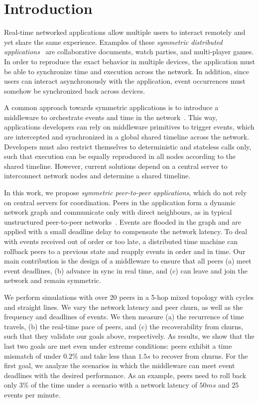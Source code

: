 \documentclass[12pt]{article}
\begin{document}
\section{Introduction}
\label{sec.introduction}

Real-time networked applications allow multiple users to interact remotely and
yet share the same experience.
Examples of these \emph{symmetric distributed applications}~\cite{gals} are
collaborative documents, watch parties, and multi-player games.
%
In order to reproduce the exact behavior in multiple devices, the application
must be able to synchronize time and execution across the network.
In addition, since users can interact asynchronously with the application,
event occurrences must somehow be synchronized back across devices.

A common approach towards symmetric applications is to introduce a middleware
to orchestrate events and time in the network~\cite{gals,croquet}.
This way, applications developers can rely on middleware primitives to trigger
events, which are intercepted and synchronized in a global shared timeline
across the network.
Developers must also restrict themselves to deterministic and stateless calls
only, such that execution can be equally reproduced in all nodes according to
the shared timeline. %
However, current solutions depend on a central server to interconnect network
nodes and determine a shared timeline.

In this work, we propose \emph{symmetric peer-to-peer applications}, which
do not rely on central servers for coordination.
Peers in the application form a dynamic network graph and communicate only
with direct neighbours, as in typical unstructured peer-to-peer
networks~\cite{p2p.survey}.
Events are flooded in the graph and are applied with a small deadline delay to
compensate the network latency.
To deal with events received out of order or too late, a distributed time
machine can rollback peers to a previous state and reapply events in order and
in time.
Our main contribution is the design of a middleware to ensure that all peers
    (a) meet event deadlines,
    (b) advance in sync in real time, and
    (c) can leave and join the network and remain symmetric.

We perform simulations with over 20 peers in a 5-hop mixed topology with cycles
and straight lines.
We vary the network latency and peer churn, as well as the frequency and
deadlines of events.
%
We then measure (a) the recurrence of time travels, (b) the real-time pace of
peers, and (c) the recoverability from churns, such that they validate our
goals above, respectively.
%
As results, we show that the last two goals are met even under extreme
conditions: peers exhibit a time mismatch of under $0.2\%$ and take less than
$1.5s$ to recover from churns.
%
For the first goal, we analyze the scenarios in which the middleware can meet
event deadlines with the desired performance.
As an example, peers need to roll back only $3\%$ of the time under a scenario
with a network latency of $50ms$ and 25 events per minute.
\end{document}
